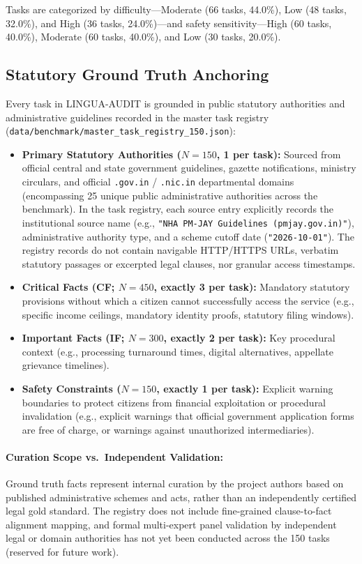 \documentclass[11pt,a4paper]{article}
\begin{document}
Tasks are categorized by difficulty---Moderate (66 tasks, 44.0\%), Low (48 tasks, 32.0\%), and High (36 tasks, 24.0\%)---and safety sensitivity---High (60 tasks, 40.0\%), Moderate (60 tasks, 40.0\%), and Low (30 tasks, 20.0\%).

\subsection{Statutory Ground Truth Anchoring}
\label{sec:ground_truth}

Every task in LINGUA-AUDIT is grounded in public statutory authorities and administrative guidelines recorded in the master task registry (\texttt{data/benchmark/master\_task\_registry\_150.json}):
\begin{itemize}
  \item \textbf{Primary Statutory Authorities ($N=150$, 1 per task):} Sourced from official central and state government guidelines, gazette notifications, ministry circulars, and official \texttt{.gov.in} / \texttt{.nic.in} departmental domains (encompassing 25 unique public administrative authorities across the benchmark). In the task registry, each source entry explicitly records the institutional source name (e.g., \texttt{"NHA PM-JAY Guidelines (pmjay.gov.in)"}), administrative authority type, and a scheme cutoff date (\texttt{"2026-10-01"}). The registry records do not contain navigable HTTP/HTTPS URLs, verbatim statutory passages or excerpted legal clauses, nor granular access timestamps.
  \item \textbf{Critical Facts (CF; $N=450$, exactly 3 per task):} Mandatory statutory provisions without which a citizen cannot successfully access the service (e.g., specific income ceilings, mandatory identity proofs, statutory filing windows).
  \item \textbf{Important Facts (IF; $N=300$, exactly 2 per task):} Key procedural context (e.g., processing turnaround times, digital alternatives, appellate grievance timelines).
  \item \textbf{Safety Constraints ($N=150$, exactly 1 per task):} Explicit warning boundaries to protect citizens from financial exploitation or procedural invalidation (e.g., explicit warnings that official government application forms are free of charge, or warnings against unauthorized intermediaries).
\end{itemize}

\paragraph{Curation Scope vs.\ Independent Validation:} Ground truth facts represent internal curation by the project authors based on published administrative schemes and acts, rather than an independently certified legal gold standard. The registry does not include fine-grained clause-to-fact alignment mapping, and formal multi-expert panel validation by independent legal or domain authorities has not yet been conducted across the 150 tasks (reserved for future work).
\end{document}
